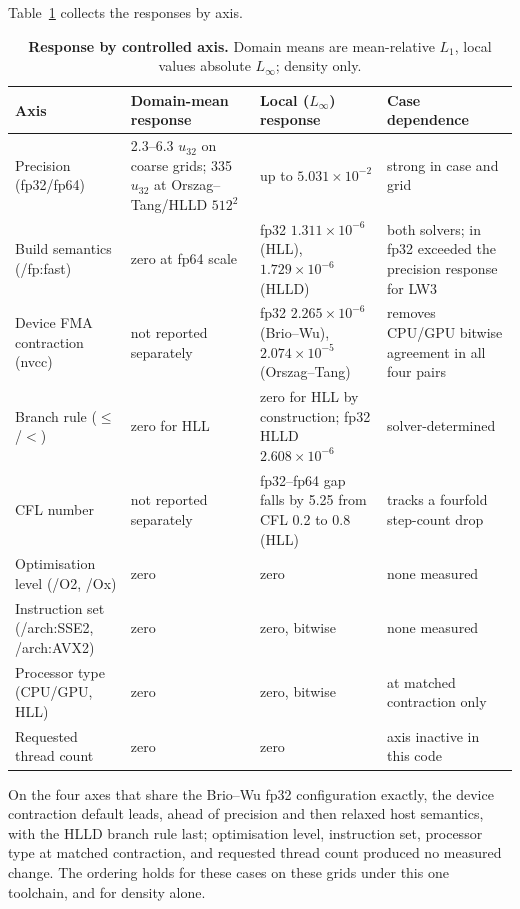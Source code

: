 Table~\ref{tab:ch6-axis-ranking} collects the responses by axis.

\begin{table}[htbp]
\centering
\small
\begin{tabularx}{\textwidth}{@{}p{}XXX@{}}
\toprule
Axis & Domain-mean response & Local ($L_\infty$) response & Case dependence \\
\midrule
Precision (fp32/fp64) & 2.3--6.3 $u_{32}$ on coarse grids; 335 $u_{32}$ at
Orszag--Tang/HLLD $512^2$ & up to $5.031\times10^{-2}$ & strong in case and
grid \\
Build semantics (/fp:fast) & zero at fp64 scale & fp32 $1.311\times10^{-6}$
(HLL), $1.729\times10^{-6}$ (HLLD) & both solvers; in fp32 exceeded the
precision response for LW3 \\
Device FMA contraction (nvcc) & not reported separately & fp32
$2.265\times10^{-6}$ (Brio--Wu), $2.074\times10^{-5}$ (Orszag--Tang) & removes
CPU/GPU bitwise agreement in all four pairs \\
Branch rule ($\le$/$<$) & zero for HLL & zero for HLL by construction; fp32
HLLD $2.608\times10^{-6}$ & solver-determined \\
CFL number & not reported separately & fp32--fp64 gap falls by 5.25 from CFL
0.2 to 0.8 (HLL) & tracks a fourfold step-count drop \\
Optimisation level (/O2, /Ox) & zero & zero & none measured \\
Instruction set (/arch:SSE2, /arch:AVX2) & zero & zero, bitwise & none
measured \\
Processor type (CPU/GPU, HLL) & zero & zero, bitwise & at matched contraction
only \\
Requested thread count & zero & zero & axis inactive in this code \\
\bottomrule
\end{tabularx}
\caption[Response by controlled axis]{\textbf{Response by controlled axis.}
Domain means are mean-relative $L_1$, local values absolute $L_\infty$;
density only.}
\label{tab:ch6-axis-ranking}
\end{table}

On the four axes that share the Brio--Wu fp32 configuration exactly, the
device contraction default leads, ahead of precision and then relaxed host
semantics, with the HLLD branch rule last; optimisation level, instruction
set, processor type at matched contraction, and requested thread count
produced no measured change. The ordering holds for these cases on these
grids under this one toolchain, and for density alone.

